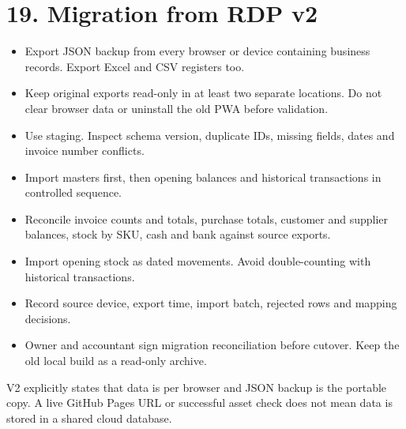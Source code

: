 \documentclass[11pt]{article}
\begin{document}
\section{19. Migration from RDP v2}
\begin{itemize}[leftmargin=*,itemsep=2pt,topsep=2pt]
\item Export JSON backup from every browser or device containing business records. Export Excel and CSV registers too.
\item Keep original exports read-only in at least two separate locations. Do not clear browser data or uninstall the old PWA before validation.
\item Use staging. Inspect schema version, duplicate IDs, missing fields, dates and invoice number conflicts.
\item Import masters first, then opening balances and historical transactions in controlled sequence.
\item Reconcile invoice counts and totals, purchase totals, customer and supplier balances, stock by SKU, cash and bank against source exports.
\item Import opening stock as dated movements. Avoid double-counting with historical transactions.
\item Record source device, export time, import batch, rejected rows and mapping decisions.
\item Owner and accountant sign migration reconciliation before cutover. Keep the old local build as a read-only archive.
\end{itemize}
V2 explicitly states that data is per browser and JSON backup is the portable copy. A live GitHub Pages URL or successful asset check does not mean data is stored in a shared cloud database.
\clearpage
\end{document}
